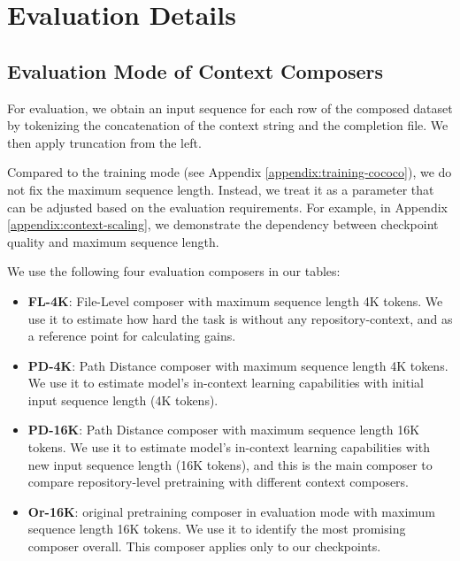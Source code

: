 \section{Evaluation Details}
\label{appendix:evaluation}

\subsection{Evaluation Mode of Context Composers}
\label{appendix:evaluation-cococo}
For evaluation, we obtain an input sequence for each row of the composed dataset by tokenizing the concatenation of the context string and the completion file. We then apply truncation from the left. 

Compared to the training mode (see Appendix \ref{appendix:training-cococo}), we do not fix the maximum sequence length. Instead, we treat it as a parameter that can be adjusted based on the evaluation requirements. For example, in Appendix \ref{appendix:context-scaling}, we demonstrate the dependency between checkpoint quality and maximum sequence length.

We use the following four evaluation composers in our tables:
\begin{itemize}
    \item \textbf{FL-4K}: File-Level composer with maximum sequence length 4K tokens. We use it to estimate how hard the task is without any repository-context, and as a reference point for calculating gains.
    \item \textbf{PD-4K}: Path Distance composer with maximum sequence length 4K tokens. We use it to estimate model's in-context learning capabilities with initial input sequence length (4K tokens).
    \item \textbf{PD-16K}: Path Distance composer with maximum sequence length 16K tokens. We use it to estimate model's in-context learning capabilities with new input sequence length (16K tokens), and this is the main composer to compare repository-level pretraining with different context composers.
    \item \textbf{Or-16K}: original pretraining composer in evaluation mode with maximum sequence length 16K tokens. We use it to identify the most promising composer overall. This composer applies only to our checkpoints.
\end{itemize}
